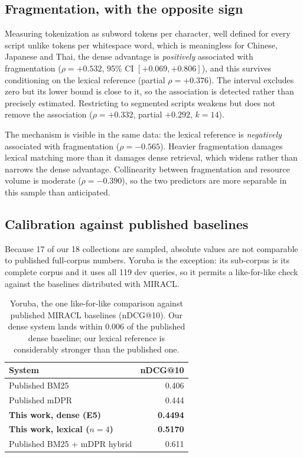 \documentclass{ijimai_article}
\begin{document}
\subsection{Fragmentation, with the opposite sign}
Measuring tokenization as subword tokens per character, well defined for every
script unlike tokens per whitespace word, which is meaningless for Chinese,
Japanese and Thai, the dense advantage is \emph{positively} associated with
fragmentation ($\rho = +0.532$, 95\% CI $[+0.069, +0.806]$), and this survives
conditioning on the lexical reference (partial $\rho = +0.376$). The interval
excludes zero but its lower bound is close to it, so the association is detected
rather than precisely estimated. Restricting to segmented scripts weakens but
does not remove the association ($\rho = +0.332$, partial $+0.292$, $k{=}14$).

The mechanism is visible in the same data: the lexical reference is
\emph{negatively} associated with fragmentation ($\rho = -0.565$). Heavier
fragmentation damages lexical matching more than it damages dense retrieval, which
widens rather than narrows the dense advantage. Collinearity between fragmentation
and resource volume is moderate ($\rho = -0.390$), so the two predictors are more
separable in this sample than anticipated.

\subsection{Calibration against published baselines}
\label{sec:calib}
Because 17 of our 18 collections are sampled, absolute values are not comparable to
published full-corpus numbers. Yoruba is the exception: its sub-corpus is its complete
corpus and it uses all 119 dev queries, so it permits a like-for-like check against the
baselines distributed with MIRACL.

\begin{table}[t]
\caption{Yoruba, the one like-for-like comparison against published MIRACL baselines
(nDCG@10). Our dense system lands within 0.006 of the published dense baseline; our
lexical reference is considerably stronger than the published one.}
\label{tab:calib}
\centering
\small
\begin{tabular}{lr}
\toprule
System & nDCG@10 \\
\midrule
Published BM25 & 0.406 \\
Published mDPR & 0.444 \\
\textbf{This work, dense (E5)} & \textbf{0.4494} \\
\textbf{This work, lexical ($n{=}4$)} & \textbf{0.5170} \\
Published BM25 + mDPR hybrid & 0.611 \\
\bottomrule
\end{tabular}
\end{table}
\end{document}
